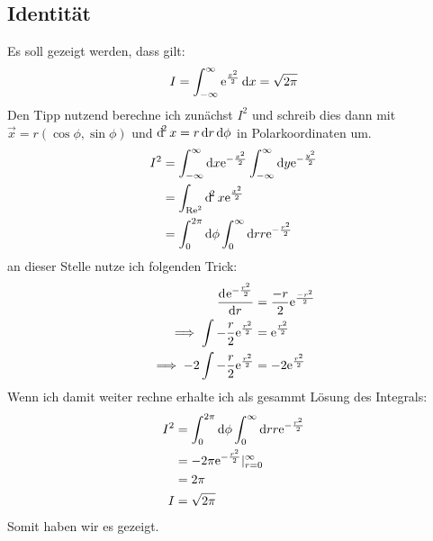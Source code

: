 \subsection{Identität}
Es soll gezeigt werden, dass gilt:
\[
    I = \int^\infty_{-\infty}\ee^{\frac{x^2}{2}}\dif x = \sqrt{2\pi}
\]
Den Tipp nutzend berechne ich zunächst $I^2$ und schreib dies dann mit $\vec x = r(\cos\phi,\sin\phi)$ und $\dif^2x = r\dif r\dif\phi$  in Polarkoordinaten um.
\begin{align*}
    I^2 &= \int^\infty_{-\infty}\dif x\ee^{-\frac{x^2}{2}}\int^\infty_{-\infty}\dif y\ee^{-\frac{y^2}{2}} \\
        &= \int_{\Re^2}\dif^2x\ee^{\frac{x^2}{2}} \\
        &= \int^{2\pi}_0\dif\phi\int^\infty_0\dif rr\ee^{-\frac{r^2}{2}} \\
\end{align*}
an dieser Stelle nutze ich folgenden Trick:
\begin{align*}
    \dod {\ee^{-\frac{r^2}{2}}}{r} &= \frac{-r}{2}\ee^{\frac{-r^2}{2}} \\
    \implies \int -\frac r2 \ee^{\frac{r^2}2} &= \ee^{\frac{r^2}2} \\
    \implies -2\int -\frac r2 \ee^{\frac{r^2}2} &= -2\ee^{\frac{r^2}2} \\
\end{align*}
Wenn ich damit weiter rechne erhalte ich als gesammt Lösung des Integrals:
\begin{align*}
    I^2 &= \int^{2\pi}_0\dif\phi\int^\infty_0\dif rr\ee^{-\frac{r^2}{2}} \\
        &=-2\pi\ee^{-\frac{r^2}2}|^\infty_{r=0} \\
        &= 2\pi \\
    I &= \sqrt{2\pi}
\end{align*}
Somit haben wir es gezeigt.

